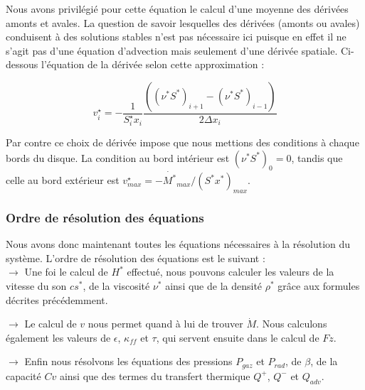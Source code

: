Nous avons privilégié pour cette équation le calcul d'une moyenne des dérivées amonts et avales. La question de savoir lesquelles des dérivées (amonts ou avales) conduisent à  des solutions stables n'est pas nécessaire ici puisque en effet il ne s'agit pas d'une équation d'advection mais seulement d'une dérivée spatiale. Ci-dessous l'équation de la dérivée selon cette approximation : 

\begin{equation}
v^\star_{i} = - \frac{1}{S_{i}^\star x_{i}} \frac{( (\nu^{*}S^{*})_{i+1} - (\nu^{*}S^{*})_{i-1} )}{2 \Delta x_{i}}
\end{equation} 

Par contre ce choix de dérivée impose que nous mettions des conditions à  chaque bords du disque. La condition au bord intérieur est  $(\nu^{*}S^{*})_{0} = 0$, tandis que celle au bord extérieur est $v^\star_{max}   = - \dot{M^{*}}_{max} / (S^{*}x^{*})_{max}$.


\subsubsection{Ordre de résolution des équations}

Nous avons donc maintenant toutes les équations  nécessaires à  la résolution du système. L'ordre de résolution des équations est le suivant :  \\

 $\rightarrow$ Une foi le calcul de $H^{*}$ effectué, nous pouvons calculer les valeurs de la vitesse du son $cs^{*}$, de la viscosité $\nu^{*}$ ainsi que de la densité $\rho^{*}$ grâce aux formules décrites précédemment.   

 $\rightarrow$ Le calcul de $v$ nous permet quand à lui de trouver $\dot{M}$. Nous calculons également les valeurs de $\epsilon$,  $\kappa_{ff}$ et $\tau$, qui servent ensuite dans le calcul de $Fz$.
 
 $\rightarrow$ Enfin nous résolvons les équations des pressions $P_{gaz}$ et $P_{rad}$, de $\beta$,  de la capacité $Cv$ ainsi que des termes du transfert thermique $Q^{+}$, $Q^{-}$ et $Q_{adv}$.



